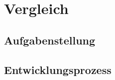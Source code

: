 \chapter{Vergleich}
\label{cha:Vergleich}

\section{Aufgabenstellung}
\label{sec:Aufgabenstellung}

\section{Entwicklungsprozess}
\label{sec:Entwicklungsprozess}
